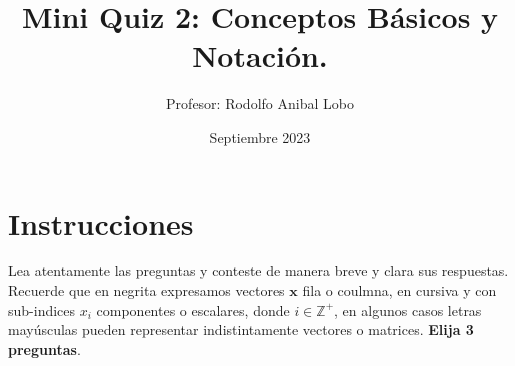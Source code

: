 \documentclass{exam}
\title{Mini Quiz 2: Conceptos Básicos y Notación.}
\author{Profesor: Rodolfo Anibal Lobo}
\date{Septiembre 2023}
\theoremstyle{definition}
\begin{document}
\maketitle



\section*{Instrucciones}
\thispagestyle{empty}
Lea atentamente las preguntas y conteste de manera breve y clara sus respuestas. Recuerde que en negrita expresamos vectores $\mathbf{x}$ fila o coulmna, en cursiva y con sub-indices $x_i$ componentes o escalares, donde $i\in \mathbb{Z}^{+}$, en algunos casos letras mayúsculas pueden representar indistintamente vectores o matrices. \textbf{Elija 3 preguntas}.
\end{document}
